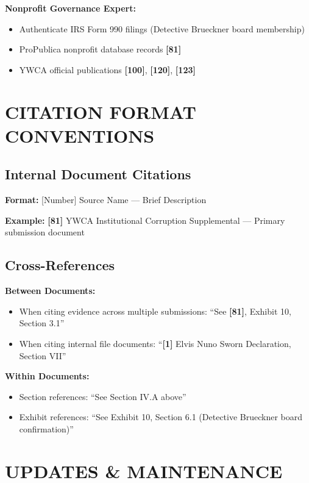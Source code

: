 \documentclass[11pt,letterpaper]{article}
\newcommand{\citeref}[1]{\textbf{\color{NavyBlue}[#1]}}
\begin{document}
\textbf{Nonprofit Governance Expert:}
\begin{itemize}[leftmargin=*]
\item Authenticate IRS Form 990 filings (Detective Brueckner board membership)
\item ProPublica nonprofit database records \citeref{81}
\item YWCA official publications \citeref{100}, \citeref{120}, \citeref{123}
\end{itemize}

\newpage

\section{CITATION FORMAT CONVENTIONS}

\subsection{Internal Document Citations}

\textbf{Format:} [Number] Source Name --- Brief Description

\textbf{Example:} \citeref{81} YWCA Institutional Corruption Supplemental --- Primary submission document

\subsection{Cross-References}

\textbf{Between Documents:}
\begin{itemize}[leftmargin=*]
\item When citing evidence across multiple submissions: ``See \citeref{81}, Exhibit 10, Section 3.1''
\item When citing internal file documents: ``\citeref{1} Elvis Nuno Sworn Declaration, Section VII''
\end{itemize}

\textbf{Within Documents:}
\begin{itemize}[leftmargin=*]
\item Section references: ``See Section IV.A above''
\item Exhibit references: ``See Exhibit 10, Section 6.1 (Detective Brueckner board confirmation)''
\end{itemize}

\newpage

\section{UPDATES \& MAINTENANCE}
\end{document}
